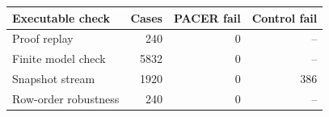 \begin{tabular}{lrrr}
\toprule
Executable check & Cases & PACER fail & Control fail\\
\midrule
Proof replay & 240 & 0 & --\\
Finite model check & 5832 & 0 & --\\
Snapshot stream & 1920 & 0 & 386\\
Row-order robustness & 240 & 0 & --\\
\bottomrule
\end{tabular}
